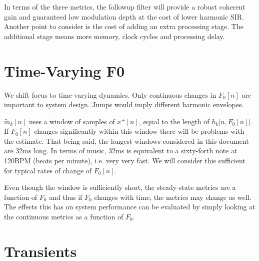 \documentclass [11pt, proquest,oneside] {ganter_thesis}[2015/03/03]
\begin{document}
In terms of the three metrics, the followup filter will provide a robust coherent gain and guaranteed low modulation depth at the cost of lower harmonic SIR.  Another point to consider is the cost of adding an extra processing stage.  The additional stage means more memory, clock cycles and processing delay.



\section{Time-Varying F0}

We shift focus to time-varying dynamics.  Only continuous changes in $F_0[n]$ are important to system design.  Jumps would imply different harmonic envelopes.

$\tilde{m}_k[n]$ uses a window of samples of $x^+[n]$, equal to the length of $h_k\big[n,F_0[n]\big]$.  If $F_0[n]$ changes significantly within this window there will be problems with the estimate.  That being said, the longest windows considered in this document are 32ms long.  In terms of music, 32ms is equivalent to a sixty-forth note at 120BPM (beats per minute), i.e. very very fast.  We will consider this sufficient for typical rates of change of $F_0[n]$.

Even though the window is sufficiently short, the steady-state metrics are a function of $F_0$ and thus if $F_0$ changes with time, the metrics may change as well.  The effects this has on system performance can be evaluated by simply looking at the continuous metrics as a function of $F_0$.

\section{Transients}\label{section:transients}
\end{document}
